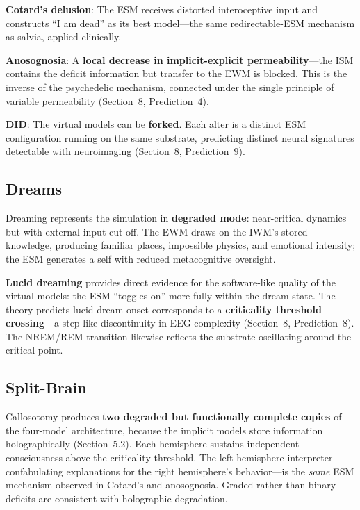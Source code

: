 \documentclass[12pt]{article}
\begin{document}
\textbf{Cotard's delusion}: The ESM receives distorted interoceptive input and constructs ``I am dead'' as its best model---\hspace{0pt}the same redirectable-ESM mechanism as salvia, applied clinically.

\textbf{Anosognosia}: A \textbf{local decrease in implicit-explicit permeability}---\hspace{0pt}the ISM contains the deficit information but transfer to the EWM is blocked. This is the inverse of the psychedelic mechanism, connected under the single principle of variable permeability (Section~8, Prediction~4).

\textbf{DID}: The virtual models can be \textbf{forked}. Each alter is a distinct ESM configuration running on the same substrate, predicting distinct neural signatures detectable with neuroimaging (Section~8, Prediction~9).


\subsection{Dreams}

Dreaming represents the simulation in \textbf{degraded mode}: near-critical dynamics but with external input cut off. The EWM draws on the IWM's stored knowledge, producing familiar places, impossible physics, and emotional intensity; the ESM generates a self with reduced metacognitive oversight.

\textbf{Lucid dreaming} provides direct evidence for the software-like quality of the virtual models: the ESM ``toggles on'' more fully within the dream state. The theory predicts lucid dream onset corresponds to a \textbf{criticality threshold crossing}---\hspace{0pt}a step-like discontinuity in EEG complexity (Section~8, Prediction~8). The NREM/REM transition likewise reflects the substrate oscillating around the critical point.


\subsection{Split-Brain}

Callosotomy \citep{Gazzaniga1962,Gazzaniga2000} produces \textbf{two degraded but functionally complete copies} of the four-model architecture, because the implicit models store information holographically (Section~5.2). Each hemisphere sustains independent consciousness above the criticality threshold. The left hemisphere interpreter \citep{Gazzaniga2000}---\hspace{0pt}confabulating explanations for the right hemisphere's behavior---\hspace{0pt}is the \emph{same} ESM mechanism observed in Cotard's and anosognosia. Graded rather than binary deficits \citep{Pinto2017} are consistent with holographic degradation.
\end{document}
